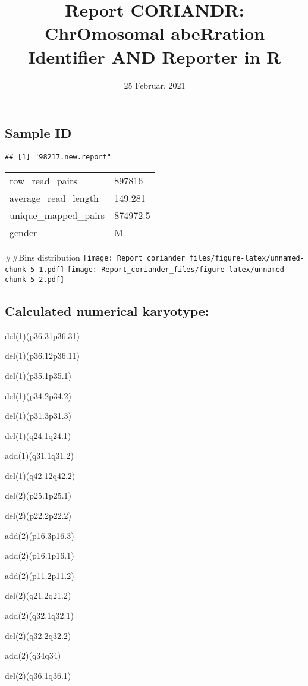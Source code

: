 \documentclass[]{article}
\title{Report CORIANDR: ChrOmosomal abeRration Identifier AND Reporter in R}
\author{}
\date{25 Februar, 2021}
\begin{document}
\maketitle

\hypertarget{sample-id}{%
\subsection{Sample ID}\label{sample-id}}

\begin{verbatim}
## [1] "98217.new.report"
\end{verbatim}

\begin{longtable}[]{@{}ll@{}}
\toprule
\endhead
row\_read\_pairs & 897816\tabularnewline
average\_read\_length & 149.281\tabularnewline
unique\_mapped\_pairs & 874972.5\tabularnewline
gender & M\tabularnewline
\bottomrule
\end{longtable}

\#\#Bins distribution
\texttt{[image: Report\_coriander\_files/figure-latex/unnamed-chunk-5-1.pdf]}
\texttt{[image: Report\_coriander\_files/figure-latex/unnamed-chunk-5-2.pdf]}

\hypertarget{calculated-numerical-karyotype}{%
\subsection{Calculated numerical
karyotype:}\label{calculated-numerical-karyotype}}

del(1)(p36.31p36.31)

del(1)(p36.12p36.11)

del(1)(p35.1p35.1)

del(1)(p34.2p34.2)

del(1)(p31.3p31.3)

del(1)(q24.1q24.1)

add(1)(q31.1q31.2)

del(1)(q42.12q42.2)

del(2)(p25.1p25.1)

del(2)(p22.2p22.2)

add(2)(p16.3p16.3)

add(2)(p16.1p16.1)

add(2)(p11.2p11.2)

del(2)(q21.2q21.2)

add(2)(q32.1q32.1)

del(2)(q32.2q32.2)

add(2)(q34q34)

del(2)(q36.1q36.1)
\end{document}
